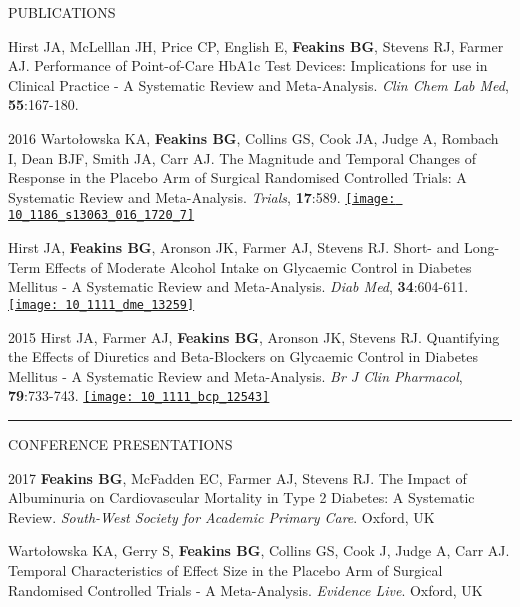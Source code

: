 \documentclass[10pt,a4paper]{article}
\begin{document}
\begin{cvlist}{PUBLICATIONS}
  \item[]
  Hirst JA, McLelllan JH, Price CP, English E, \textbf{Feakins BG}, Stevens RJ, Farmer AJ. Performance of Point-of-Care HbA1c Test Devices: Implications for use in Clinical Practice - A Systematic Review and Meta-Analysis. \textit{Clin Chem Lab Med}, \textbf{55}:167-180. 
  
  \item[2016]
  Warto\l{}owska KA, \textbf{Feakins BG}, Collins GS, Cook JA, Judge A, Rombach I, Dean BJF, Smith JA, Carr AJ. The Magnitude and Temporal Changes of Response in the Placebo Arm of Surgical Randomised Controlled Trials: A Systematic Review and Meta-Analysis. \textit{Trials}, \textbf{17}:589.  \href{https://biomedcentral.altmetric.com/details/14679542}{\texttt{[image: 10\_1186\_s13063\_016\_1720\_7]}}
  
  \item[]
  Hirst JA, \textbf{Feakins BG}, Aronson JK, Farmer AJ, Stevens RJ. Short- and Long-Term Effects of Moderate Alcohol Intake on Glycaemic Control in Diabetes Mellitus - A Systematic Review and Meta-Analysis. \textit{Diab Med}, \textbf{34}:604-611.  \href{https://wiley.altmetric.com/details/11898077}{\texttt{[image: 10\_1111\_dme\_13259]}}
  
  \item[2015]
  Hirst JA, Farmer AJ, \textbf{Feakins BG}, Aronson JK, Stevens RJ. Quantifying the Effects of Diuretics and Beta-Blockers on Glycaemic Control in Diabetes Mellitus - A Systematic Review and Meta-Analysis. \textit{Br J Clin Pharmacol}, \textbf{79}:733-743.  \href{https://wiley.altmetric.com/details/2869563}{\texttt{[image: 10\_1111\_bcp\_12543]}}
  
\end{cvlist}


\noindent\rule{\textwidth}{0.4pt}
\begin{cvlist}{CONFERENCE PRESENTATIONS}
  
  \item[2017]
  \textbf{Feakins BG}, McFadden EC, Farmer AJ, Stevens RJ. The Impact of Albuminuria on Cardiovascular Mortality in Type 2 Diabetes: A Systematic Review. \textit{South-West Society for Academic Primary Care}. Oxford, UK
  
  \item[]
  Warto\l{}owska KA, Gerry S, \textbf{Feakins BG}, Collins GS, Cook J, Judge A, Carr AJ. Temporal Characteristics of Effect Size in the Placebo Arm of Surgical Randomised Controlled Trials - A Meta-Analysis. \textit{Evidence Live}. Oxford, UK
  
\end{cvlist}
\end{document}
